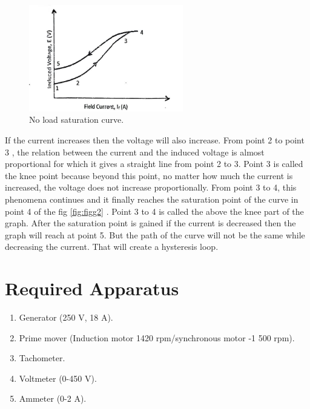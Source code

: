 \begin{figure}[hbt!]
\vspace{00mm}
    \centerline{\includegraphics[width=0.6\textwidth]{Figures/Exp02/Lab 1 residual magnetization.jpeg}}
    \vspace{0mm}
    \caption{No load saturation curve.}
    \label{fig:figg1}
\end{figure}
If the current increases then the voltage will also increase. From point 2 to point 3  , the relation between the current and the induced voltage is almost proportional for which it gives a straight line from point 2 to 3. Point 3 is called the knee point because beyond this point, no matter how much the current is increased, the voltage does not increase proportionally. From point 3 to 4, this phenomena continues and it finally reaches the saturation point of the curve in point 4 of the fig \ref{fig:figg2} . Point 3 to 4 is called the above the knee part of the graph. After the saturation point is gained if the current is decreased then the graph will reach at point 5. But the path of the curve will not be the same while decreasing the current. That will create a hysteresis loop.


\section{Required Apparatus}
\begin{enumerate}
\item Generator (250 V, 18 A). 
\item Prime mover (Induction motor 1420 rpm/synchronous motor -1 500 rpm). 
\item  Tachometer. 
\item Voltmeter (0-450 V). 
\item Ammeter (0-2 A).
\end{enumerate}




